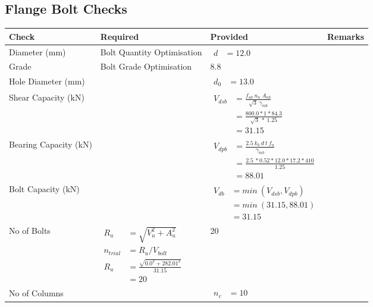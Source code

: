 \documentclass{article}%
\begin{document}
\subsection{Flange Bolt Checks}%
\label{subsec:FlangeBoltChecks}%
\renewcommand{\arraystretch}{1.2}%
\begin{longtable}{|p{4cm}|p{5cm}|p{5.5cm}|p{1.5cm}|}%
\hline%
\rowcolor{OsdagGreen}%
Check&Required&Provided&Remarks\\%
\hline%
\endhead%
\hline%
Diameter (mm)&Bolt Quantity Optimisation&$\begin{aligned} d &=12.0 \end{aligned}$&\\%
\hline%
Grade&Bolt Grade Optimisation&8.8&\\%
\hline%
Hole Diameter (mm)& &$\begin{aligned} d_0 &=13.0 \end{aligned}$&\\%
\hline%
Shear Capacity (kN)&&$\begin{aligned}V_{dsb} &= \frac{f_{ub} ~n_n~ A_{nb}}{\sqrt{3} ~\gamma_{mb}}\\ &= \frac{800.0*1*84.3}{\sqrt{3}~*~1.25}\\ &= 31.15\end{aligned}$&\\%
\hline%
Bearing Capacity (kN)&&$\begin{aligned}V_{dpb} &= \frac{2.5~ k_b~ d~ t~ f_u}{\gamma_{mb}}\\ &= \frac{2.5~*0.52*12.0*17.2*410}{1.25}\\ &=88.01\end{aligned}$&\\%
\hline%
Bolt Capacity (kN)&&$\begin{aligned}V_{db} &= min~ (V_{dsb}, V_{dpb})\\ &= min~ (31.15,88.01)\\ &=31.15\end{aligned}$&\\%
\hline%
No of Bolts&$\begin{aligned}R_{u} &= \sqrt{V_u^2+A_u^2}\\ n_{trial} &= R_u/ V_{bolt}\\ R_{u} &= \frac{\sqrt{0.0^2+282.01^2}}{31.15}\\ &=20\end{aligned}$&20&\\%
\hline%
No of Columns&&$\begin{aligned} n_c &=10 \end{aligned}$&\\%

\end{longtable}
\end{document}
